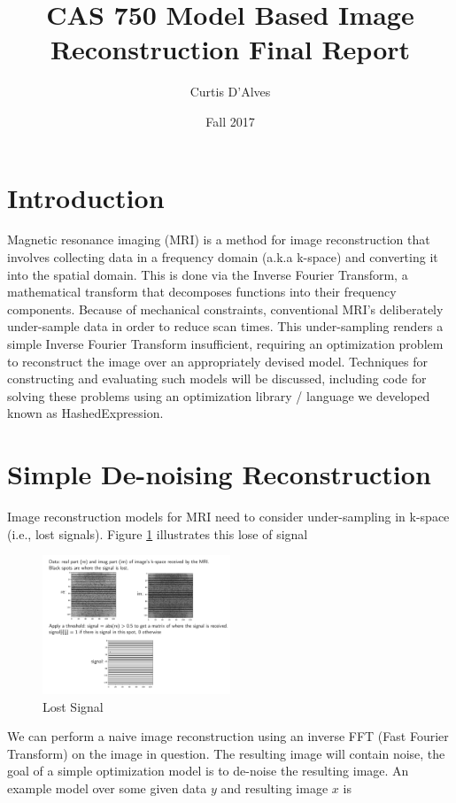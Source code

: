 \documentclass[11pt]{article}
\author{Curtis D'Alves}
\date{Fall 2017}
\title{CAS 750 Model Based Image Reconstruction Final Report}
\begin{document}
\maketitle
\newpage
\section{Introduction}
\label{sec:orgb88e20d}
Magnetic resonance imaging (MRI) is a method for image reconstruction that
involves collecting data in a frequency domain (a.k.a k-space) and converting
it into the spatial domain. This is done via the Inverse Fourier Transform, a
mathematical transform that decomposes functions into their frequency
components. Because of mechanical constraints, conventional MRI's deliberately
under-sample data in order to reduce scan times. This under-sampling renders a
simple Inverse Fourier Transform insufficient, requiring an optimization
problem to reconstruct the image over an appropriately devised model.
Techniques for constructing and evaluating such models will be discussed,
including code for solving these problems using an optimization library /
language we developed known as HashedExpression.


\section{Simple De-noising Reconstruction}
\label{sec:org6986886}

Image reconstruction models for MRI need to consider under-sampling in k-space
(i.e., lost signals). Figure \ref{fig:LostSignal} illustrates this lose of signal

\begin{figure}[!htpb]
\centering
\includegraphics[width=0.5\textwidth]{figs/MRIBrain1.pdf}
\caption{\label{fig:LostSignal}Lost Signal}
\end{figure}

We can perform a naive image reconstruction using an inverse FFT (Fast Fourier
Transform) on the image in question. The resulting image will contain noise,
the goal of a simple optimization model is to de-noise the resulting image. An
example model over some given data \(y\) and resulting image \(x\) is
\end{document}
